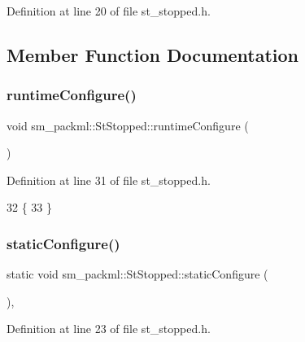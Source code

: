Definition at line 20 of file st\+\_\+stopped.\+h.



\subsection{Member Function Documentation}
\mbox{\label{structsm__packml_1_1StStopped_ab528cd96bea69cd24c9f983b24a76613}} 
\subsubsection{\texorpdfstring{runtime\+Configure()}{runtimeConfigure()}}
{\footnotesize\ttfamily void sm\+\_\+packml\+::\+St\+Stopped\+::runtime\+Configure (\begin{DoxyParamCaption}{ }\end{DoxyParamCaption})\hspace{0.3cm}{\ttfamily [inline]}}



Definition at line 31 of file st\+\_\+stopped.\+h.


\begin{DoxyCode}
32     \{
33     \}
\end{DoxyCode}
\mbox{\label{structsm__packml_1_1StStopped_a84b427f80c9eb93589568de34c5d6817}} 
\subsubsection{\texorpdfstring{static\+Configure()}{staticConfigure()}}
{\footnotesize\ttfamily static void sm\+\_\+packml\+::\+St\+Stopped\+::static\+Configure (\begin{DoxyParamCaption}{ }\end{DoxyParamCaption})\hspace{0.3cm}{\ttfamily [inline]}, {\ttfamily [static]}}



Definition at line 23 of file st\+\_\+stopped.\+h.


